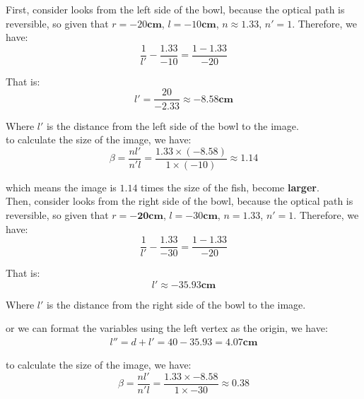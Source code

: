 \documentclass{article}
\begin{document}
First, consider looks from the left side of the bowl, because the optical path is reversible, so given that $r = -20\mathbf{cm}$, $l = -10\mathbf{cm}$, $n \approx 1.33$, $n' = 1$. Therefore, we have:
\begin{equation}
    \frac{1}{l'} - \frac{1.33}{-10} = \frac{1-1.33}{-20}
\end{equation}

That is:
\begin{equation}
    \boxed{
        l' = \frac{20}{-2.33} \approx -8.58\mathbf{cm}
    }
\end{equation}

Where $l'$ is the distance from the left side of the bowl to the image.\\

to calculate the size of the image, we have:
\begin{equation}
    \boxed{
        \beta = \frac{nl'}{n'l} = \frac{1.33 \times (-8.58)}{1 \times (-10)} \approx 1.14
    }
\end{equation}

which means the image is $\mathbf{1.14}$ times the size of the fish, become \textbf{larger}.\\

Then, consider looks from the right side of the bowl, because the optical path is reversible, so given that $r = -\mathbf{20cm}$, $l = -30\mathbf{cm} $, $n = 1.33$, $n' = 1$. Therefore, we have:
\begin{equation}
    \frac{1}{l'} - \frac{1.33}{-30} = \frac{1-1.33}{-20}
\end{equation}

That is:
\begin{equation}
    \boxed{
        l' \approx -35.93\mathbf{cm}
    }
\end{equation}

Where $l'$ is the distance from the right side of the bowl to the image.

or we can format the variables using the left vertex as the origin, we have:
\begin{align}
    \boxed{
        l'' = d + l' = 40 - 35.93 = 4.07 \mathbf{cm}
    }
\end{align}

to calculate the size of the image, we have:
\begin{equation}
    \boxed{
        \beta = \frac{nl'}{n'l} = \frac{1.33 \times -8.58}{1 \times -30} \approx 0.38
    }
\end{equation}
\end{document}
